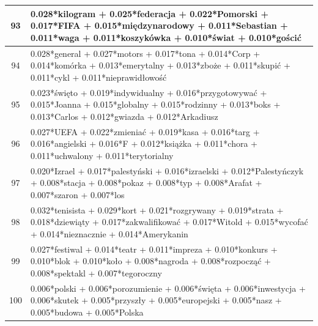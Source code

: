 \documentclass[11pt,a4paper]{article}
\begin{document}
\begin{table}[h]
\begin{tabular}{|c|>{\footnotesize}p{\linewidth}|}
93 & 0.028*kilogram + 0.025*federacja + 0.022*Pomorski + 0.017*FIFA + 0.015*międzynarodowy + 0.011*Sebastian + 0.011*waga + 0.011*koszykówka + 0.010*świat + 0.010*gościć\\\hline
94 & 0.028*general + 0.027*motors + 0.017*tona + 0.014*Corp + 0.014*komórka + 0.013*emerytalny + 0.013*zboże + 0.011*skupić + 0.011*cykl + 0.011*nieprawidłowość\\\hline
95 & 0.023*święto + 0.019*indywidualny + 0.016*przygotowywać + 0.015*Joanna + 0.015*globalny + 0.015*rodzinny + 0.013*boks + 0.013*Carlos + 0.012*gwiazda + 0.012*Arkadiusz\\\hline
96 & 0.027*UEFA + 0.022*zmieniać + 0.019*kasa + 0.016*targ + 0.016*angielski + 0.016*F + 0.012*książka + 0.011*chora + 0.011*uchwalony + 0.011*terytorialny\\\hline
97 & 0.020*Izrael + 0.017*palestyński + 0.016*izraelski + 0.012*Palestyńczyk + 0.008*stacja + 0.008*pokaz + 0.008*typ + 0.008*Arafat + 0.007*szaron + 0.007*los\\\hline
98 & 0.032*tenisista + 0.029*kort + 0.021*rozgrywany + 0.019*strata + 0.018*dziewiąty + 0.017*zakwalifikować + 0.017*Witold + 0.015*wycofać + 0.014*nieznacznie + 0.014*Amerykanin\\\hline
99 & 0.027*festiwal + 0.014*teatr + 0.011*impreza + 0.010*konkurs + 0.010*blok + 0.010*koło + 0.008*nagroda + 0.008*rozpocząć + 0.008*spektakl + 0.007*tegoroczny\\\hline
100 & 0.006*polski + 0.006*porozumienie + 0.006*święta + 0.006*inwestycja + 0.006*skutek + 0.005*przyszły + 0.005*europejski + 0.005*nasz + 0.005*budowa + 0.005*Polska\\\hline

\end{tabular}
\end{table}
\FloatBarrier

\pagebreak

\listoftables

\pagebreak
{}
\listoffigures

\pagebreak
{}



\enddocument
\end{document}
